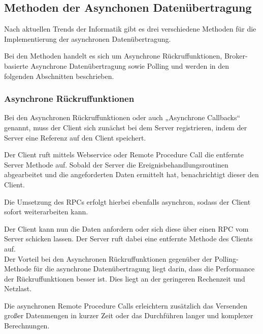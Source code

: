 \subsection{Methoden der Asynchonen Datenübertragung}
Nach aktuellen Trends der Informatik gibt es drei verschiedene Methoden für die Implementierung der asynchronen Datenübertragung. 

Bei den Methoden handelt es sich um Asynchrone Rückruffunktionen, Broker-basierte Asynchrone Datenübertragung sowie Polling und werden in den folgenden Abschnitten beschrieben. 

\subsubsection{Asynchrone Rückruffunktionen}
Bei den Asynchronen Rückruffunktionen oder auch „Asynchrone Callbacks“ genannt, muss der Client sich zunächst bei dem Server registrieren, indem der Server eine Referenz auf den Client speichert. \cite{abts:2019}

Der Client ruft mittels Webservice oder Remote Procedure Call die entfernte Server Methode auf. Sobald der Server die Ereignisbehandlungsroutinen abgearbeitet und die angeforderten Daten ermittelt hat, benachrichtigt dieser den Client. \cite*{bengelbaun:2015}

Die Umsetzung des RPCs erfolgt hierbei ebenfalls asynchron, sodass der Client sofort weiterarbeiten kann. \cite*{schill:2012}

Der Client kann nun die Daten anfordern oder sich diese über einen RPC vom Server schicken lassen. Der Server ruft dabei eine entfernte Methode des Clients auf. \cite*{abts:2019,schill:2012}  \\

Der Vorteil bei den Asynchronen Rückruffunktionen gegenüber der Polling-Methode für die asynchrone Datenübertragung liegt darin, dass die Performance der Rückruffunktionen besser ist. Dies liegt an der geringeren Rechenzeit und Netzlast. \cite*{abts:2019}

Die asynchronen Remote Procedure Calls erleichtern zusätzlich das Versenden großer Datenmengen in kurzer Zeit oder das Durchführen langer und komplexer Berechnungen. \cite*{schill:2012}